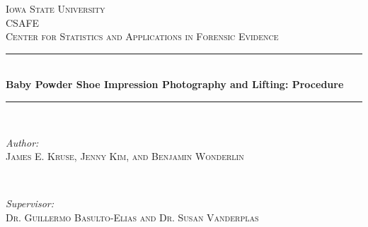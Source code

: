 \begin{titlepage}

\newcommand{\HRule}{\rule{\linewidth}{0.5mm}} %

\center %


\textsc{\LARGE Iowa State University}\\[1.5cm] %
\textsc{\Large CSAFE}\\[0.5cm] %
\textsc{\large Center for Statistics and Applications in Forensic Evidence }\\[0.5cm] %


\HRule \\[0.4cm]
{ \huge \bfseries Baby Powder Shoe Impression Photography and Lifting: Procedure}\\[0.4cm] %
\HRule \\[1.5cm]


\begin{minipage}{0.4\textwidth}
\begin{flushleft} \large
\emph{Author:}\\
\textsc{James E. Kruse, Jenny Kim, and Benjamin Wonderlin} %
\end{flushleft}
\end{minipage}
~
\begin{minipage}{0.4\textwidth}
\begin{flushright} \large
\emph{Supervisor:} \\
\textsc{Dr. Guillermo Basulto-Elias and Dr. Susan Vanderplas} %
\end{flushright}
\end{minipage}\\[2cm]


\end{titlepage}

